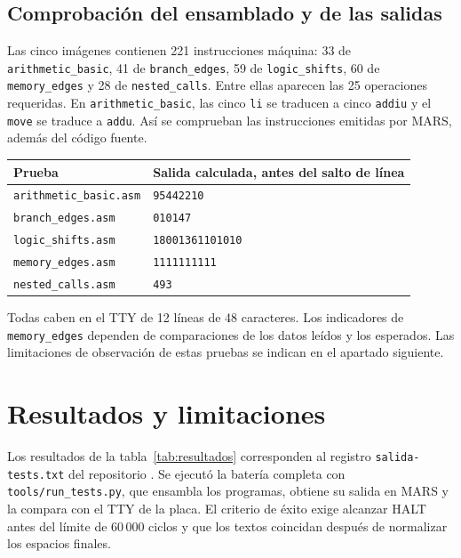 \documentclass[11pt,a4paper]{article}
\newcommand{\sig}[1]{\texttt{#1}}
\begin{document}
\subsection{Comprobación del ensamblado y de las salidas}

Las cinco imágenes contienen 221 instrucciones máquina: 33 de
\sig{arithmetic\_basic}, 41 de \sig{branch\_edges}, 59 de
\sig{logic\_shifts}, 60 de \sig{memory\_edges} y 28 de
\sig{nested\_calls}. Entre ellas aparecen las 25 operaciones requeridas.
En \sig{arithmetic\_basic}, las cinco \sig{li} se traducen a cinco
\sig{addiu} y el \sig{move} se traduce a \sig{addu}. Así se comprueban las
instrucciones emitidas por MARS, además del código fuente.

\begin{center}\small
\begin{tabular}{@{}ll@{}}
\toprule Prueba & Salida calculada, antes del salto de línea \\\midrule
\sig{arithmetic\_basic.asm} & \sig{95442210} \\
\sig{branch\_edges.asm} & \sig{010147} \\
\sig{logic\_shifts.asm} & \sig{18001361101010} \\
\sig{memory\_edges.asm} & \sig{1111111111} \\
\sig{nested\_calls.asm} & \sig{493} \\\bottomrule
\end{tabular}
\end{center}

Todas caben en el TTY de 12 líneas de 48 caracteres. Los indicadores de
\sig{memory\_edges} dependen de comparaciones de los datos leídos y los
esperados. Las limitaciones de observación de estas pruebas se indican en
el apartado siguiente.

\clearpage
\section{Resultados y limitaciones}

Los resultados de la tabla~\ref{tab:resultados} corresponden al registro
\sig{salida-tests.txt} del repositorio \cite{resultados}. Se ejecutó la
batería completa con \sig{tools/run\_tests.py}, que ensambla los programas,
obtiene su salida en MARS y la compara con el TTY de la placa. El criterio
de éxito exige alcanzar HALT antes del límite de 60\,000 ciclos y que los
textos coincidan después de normalizar los espacios finales.
\end{document}
